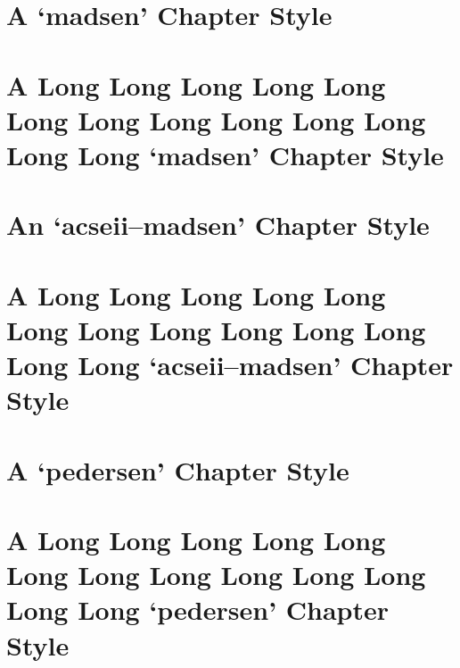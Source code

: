 \documentclass[10pt,a4paper,extrafontsizes,oldfontcommands,oneside]{memoir}
\begin{document}

\chapter{A `madsen' Chapter Style} %
\label{chap:a_madsen_chapter_style}



\chapter{A Long Long Long Long Long Long Long Long Long Long Long Long Long `madsen' Chapter Style} %
\label{chap:a_long_madsen_chapter_style}


\chapter{An `acseii--madsen' Chapter Style} %
\label{chap:a_acseii_chapter_style}


\chapter{A Long Long Long Long Long Long Long Long Long Long Long Long Long `acseii--madsen' Chapter Style} %
\label{chap:a_long_acseii_chapter_style}


\chapter{A `pedersen' Chapter Style} %
\label{chap:a_pedersen_chapter_style}



\chapter{A Long Long Long Long Long Long Long Long Long Long Long Long Long `pedersen' Chapter Style} %
\label{chap:a_long_pedersen_chapter_style}

\end{document}
